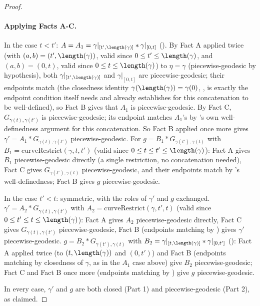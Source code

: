 \begin{proof}
  \paragraph{Applying Facts A-C.} In the case $t<t'$: $A = A_1 =
  \gamma|_{[t',\length(\gamma)]} * \gamma|_{[0,t]}$ (). By Fact A applied
  twice (with $(a,b)=(t',\length(\gamma))$, valid since $0\le t' \le \length(\gamma)$, and
  $(a,b)=(0,t)$, valid since $0\le t\le\length(\gamma)$) to $\eta=\gamma$ (piecewise-geodesic by
  hypothesis), both $\gamma|_{[t',\length(\gamma)]}$ and $\gamma|_{[0,t]}$ are piecewise-geodesic;
  their endpoints match (the closedness identity $\gamma(\length(\gamma))=\gamma(0)$,
  , is exactly the endpoint condition  itself
  needs and already establishes for this concatenation to be well-defined), so Fact B gives that
  $A_1$ is piecewise-geodesic. By Fact C, $G_{\gamma(t),\gamma(t')}$ is piecewise-geodesic; its
  endpoint matches $A_1$'s by 's own well-definedness argument for this
  concatenation. So Fact B applied once more gives $\gamma' = A_1 * G_{\gamma(t),\gamma(t')}$
  piecewise-geodesic. For $g = B_1 * G_{\gamma(t'),\gamma(t)}$ with $B_1 =
  \mathrm{curveRestrict}(\gamma,t,t')$ (valid since $0\le t\le t' \le \length(\gamma)$): Fact A gives
  $B_1$ piecewise-geodesic directly (a single restriction, no concatenation needed), Fact C gives
  $G_{\gamma(t'),\gamma(t)}$ piecewise-geodesic, and their endpoints match by 's
  well-definedness; Fact B gives $g$ piecewise-geodesic.

  In the case $t'<t$: symmetric, with the roles of $\gamma'$ and $g$ exchanged. $\gamma' = A_2 *
  G_{\gamma(t),\gamma(t')}$ with $A_2 = \mathrm{curveRestrict}(\gamma,t',t)$ (valid since $0 \le t'
  \le t \le \length(\gamma)$): Fact A gives $A_2$ piecewise-geodesic directly, Fact C gives
  $G_{\gamma(t),\gamma(t')}$ piecewise-geodesic, Fact B (endpoints matching by )
  gives $\gamma'$ piecewise-geodesic. $g = B_2 * G_{\gamma(t'),\gamma(t)}$ with $B_2 =
  \gamma|_{[t,\length(\gamma)]} * \gamma|_{[0,t']}$ (): Fact A applied
  twice (to $(t,\length(\gamma))$ and $(0,t')$) and Fact B (endpoints matching by closedness of
  $\gamma$, as in the $A_1$ case above) give $B_2$ piecewise-geodesic; Fact C and Fact B once more
  (endpoints matching by ) give $g$ piecewise-geodesic.

  In every case, $\gamma'$ and $g$ are both closed (Part 1) and piecewise-geodesic (Part 2), as
  claimed.
\end{proof}
